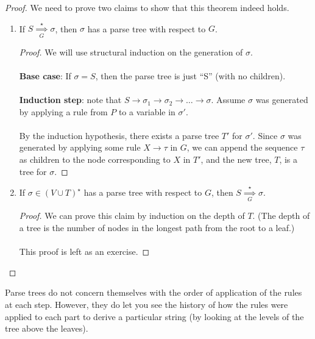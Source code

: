 \documentclass[]{article}
\theoremstyle{definition}
\newcommand{\lecture}[1]{\marginpar{{\footnotesize $\leftarrow$ \underline{#1}}}}
\begin{document}
      \begin{proof}
        We need to prove two claims to show that this theorem indeed holds.
        \begin{enumerate}
          \item If $S \underset{G}{\overset{\star}{\implies}} \sigma$, then $\sigma$ has a parse tree with respect to $G$.

          \begin{proof}
            We will use structural induction on the generation of $\sigma$.
            \\ \\
            \textbf{Base case}: If $\sigma = S$, then the parse tree is just ``S'' (with no children).
            \\ \\
            \textbf{Induction step}: note that $S \to \sigma_1 \to \sigma_2 \to \ldots \to \sigma$. Assume $\sigma$ was generated by applying a rule from $P$ to a variable in $\sigma'$.
            \\ \\
            By the induction hypothesis, there exists a parse tree $T'$ for $\sigma'$. Since $\sigma$ was generated by applying some rule $X \to \tau$ in $G$, we can append the sequence $\tau$ as children to the node corresponding to $X$ in $T'$, and the new tree, $T$, is a tree for $\sigma$.
          \end{proof}

          \item If $\sigma \in (V \cup T)^\star$ has a parse tree with respect to $G$, then $S \underset{G}{\overset{\star}{\implies}} \sigma$.

          \begin{proof}
            We can prove this claim by induction on the depth of $T$. (The depth of a tree is the number of nodes in the longest path from the root to a leaf.)
            \\ \\
            This proof is left as an exercise.
          \end{proof}
        \end{enumerate}
      \end{proof}

      \lecture{October 17, 2013}
      Parse trees do not concern themselves with the order of application of the rules at each step. However, they do let you see the history of how the rules were applied to each part to derive a particular string (by looking at the levels of the tree above the leaves).
\end{document}
